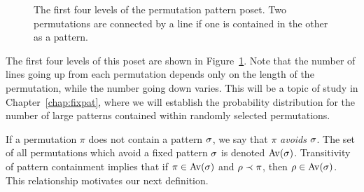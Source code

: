 \begin{figure}[t]
{
        }
    \caption[The first four levels of the permutation pattern poset.]{
          The first four levels of the permutation pattern poset. Two
          permutations are connected by a line if one is contained in the other
          as a pattern.}
    \label{prelim:fig:poset}
    \end{figure}

    The first four levels of this poset are shown in
    Figure~\ref{prelim:fig:poset}. Note that the number of lines going up from
    each permutation depends only on the length of the permutation, while the
    number going down varies. This will be a topic of study in
    Chapter~\ref{chap:fixpat}, where we will establish the probability
    distribution for the number of large patterns contained within randomly
    selected permutations. 

    If a permutation $\pi$ does not contain a pattern $\sigma$, we say that $\pi$
    \emph{avoids} $\sigma$. The set of all permutations which avoid a fixed
    pattern $\sigma$ is denoted $\operatorname{{Av}}(\sigma)$. Transitivity of pattern containment
    implies that if $\pi \in \operatorname{{Av}}(\sigma)$ and $\rho \prec \pi$, then $\rho \in
    \operatorname{{Av}}(\sigma)$. This relationship motivates our next definition. 



